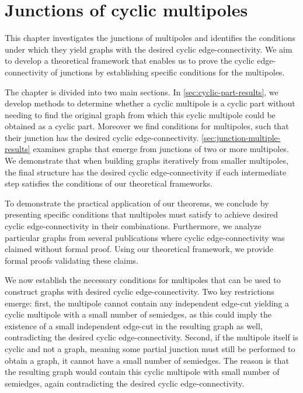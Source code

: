 \documentclass[12pt, twoside]{book}
\begin{document}
\chapter{Junctions of cyclic multipoles}

This chapter investigates the junctions of multipoles and identifies the conditions under which they yield graphs with the desired cyclic edge-connectivity. We aim to develop a theoretical framework that enables us to prove the cyclic edge-connectivity of junctions by establishing specific conditions for the multipoles.

The chapter is divided into two main sections. In \cref{sec:cyclic-part-results}, we develop methods to determine whether a cyclic multipole is a cyclic part without needing to find the original graph from which this cyclic multipole could be obtained as a cyclic part. Moreover we find conditions for multipoles, such that their junction has the desired cyclic edge-connectivity. \cref{sec:junction-multiple-results} examines graphs that emerge from junctions of two or more multipoles. We demonstrate that when building graphs iteratively from smaller multipoles, the final structure has the desired cyclic edge-connectivity if each intermediate step satisfies the conditions of our theoretical frameworks.

To demonstrate the practical application of our theorems, we conclude by presenting specific conditions that multipoles must satisfy to achieve desired cyclic edge-connectivity in their combinations. Furthermore, we analyze particular graphs from several publications \cite{Kochol1996, Macajova2006} where cyclic edge-connectivity was claimed without formal proof. Using our theoretical framework, we provide formal proofs validating these claims.

We now establish the necessary conditions for multipoles that can be used to construct graphs with desired cyclic edge-connectivity. Two key restrictions emerge: first, the multipole cannot contain any independent edge-cut yielding a cyclic multipole with a small number of semiedges, as this could imply the existence of a small independent edge-cut in the resulting graph as well, contradicting the desired cyclic edge-connectivity. Second, if the multipole itself is cyclic and not a graph, meaning some partial junction must still be performed to obtain a graph, it cannot have a small number of semiedges. The reason is that the resulting graph would contain this cyclic multipole with small number of semiedges, again contradicting the desired cyclic edge-connectivity.
\end{document}
